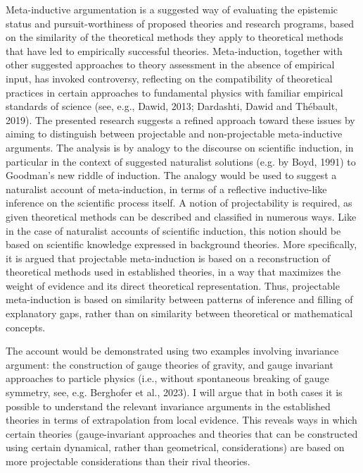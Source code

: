 \documentclass[11pt]{article}
\begin{document}
Meta-inductive argumentation is a suggested way of evaluating the epistemic status and pursuit-worthiness of proposed theories and research programs, based on the similarity of the theoretical methods they apply to theoretical methods that have led to empirically successful theories. Meta-induction, together with other suggested approaches to theory assessment in the absence of empirical input, has invoked controversy, reflecting on the compatibility of theoretical practices in certain approaches to fundamental physics with familiar empirical standards  of science (see, e.g., Dawid, 2013; Dardashti, Dawid and Thébault, 2019). The presented research suggests a refined approach toward these issues by aiming to distinguish between projectable and non-projectable meta-inductive arguments.  The analysis is by analogy to the discourse on scientific induction, in particular  in the context of suggested naturalist solutions (e.g. by Boyd, 1991) to Goodman’s new riddle of induction. The analogy would be used to suggest a naturalist account of meta-induction, in terms of a reflective inductive-like inference on the scientific process itself. A notion of projectability is required, as given theoretical methods can be described and classified in numerous ways. Like in the case of naturalist accounts of scientific induction, this notion should be based on scientific knowledge expressed in background theories. More specifically, it is argued that projectable meta-induction is based on a reconstruction of theoretical methods used in established theories, in a way that maximizes the weight of evidence and its direct theoretical representation. Thus, projectable meta-induction is based on similarity between patterns of inference and filling of explanatory gaps, rather than on similarity between theoretical or mathematical concepts.

The account would be demonstrated using two examples involving invariance argument: the construction of gauge theories of gravity, and gauge invariant approaches to particle physics (i.e., without spontaneous breaking of gauge symmetry, see, e.g. Berghofer et al., 2023). I will argue that in both cases it is possible to understand the relevant invariance arguments in the established theories in terms of extrapolation from local evidence.  This reveals ways in which certain theories (gauge-invariant approaches and theories that can be constructed using certain dynamical, rather than geometrical, considerations) are based on more projectable considerations than their rival theories. 
\end{document}

